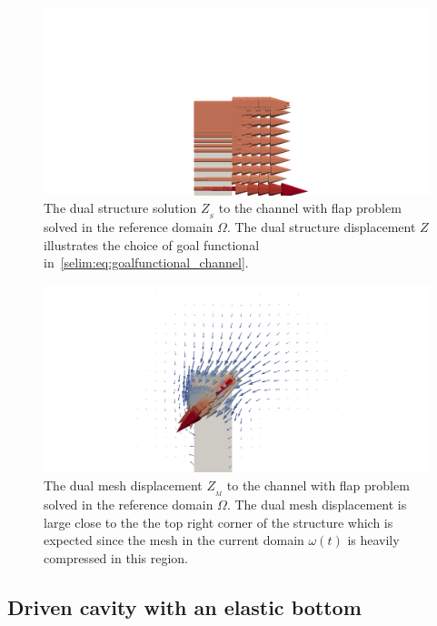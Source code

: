 \begin{figure}
  \label{selim:fig:dual_channel_ZS}
\caption{The dual structure solution $Z_{_{S}}$ to the channel with
  flap problem solved in the reference domain $\Omega$. The dual
  structure displacement $Z$ illustrates the choice of goal
  functional in~\eqref{selim:eq:goalfunctional_channel}.}
\includegraphics[width=1.0\textwidth]{chapters/selim/png/channelZS.png}
\end{figure}
\begin{figure}
  \label{selim:fig:dual_channel_ZM}
\caption{The dual mesh displacement $Z_{_{M}}$ to the channel with
  flap problem solved in the reference domain $\Omega$. The dual mesh
  displacement is large close to the the top right corner of the
  structure which is expected since the mesh in the current domain
  $\omega(t)$ is heavily compressed in this region.}
\includegraphics[width=1.0\textwidth]{chapters/selim/png/channelZM.png}
\end{figure}

\subsection{Driven cavity with an elastic bottom}


